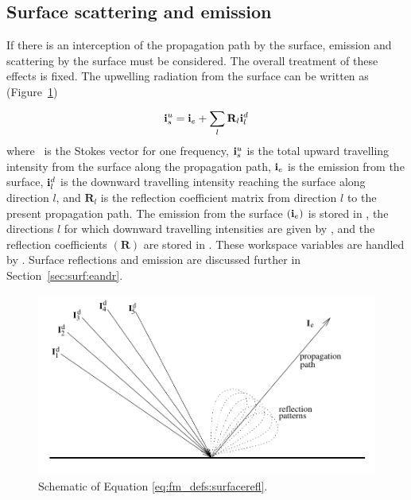 \subsection{Surface scattering and emission}
\label{sec:fm_defs:surface}

If there is an interception of the propagation path by the surface,
emission and scattering by the surface must be considered. The overall
treatment of these effects is fixed. The upwelling radiation from the surface
can be written as (Figure~\ref{fig:fm_defs:surface_refl})
\begin{equation}
  \mathbf{i}_s^u = \mathbf{i}_e + \sum_l^{} \mathbf{R}_l \mathbf{i}_l^d
  \label{eq:fm_defs:surfacerefl}
\end{equation}
where \MpiVct\ is the Stokes vector for one frequency, $\mathbf{i}_s^u$
is the total upward travelling intensity from the surface along the
propagation path, $\mathbf{i}_e$ is the emission from the surface,
$\mathbf{i}_l^d$ is the downward travelling intensity reaching the
surface along direction $l$, and $\mathbf{R}_l$ is the reflection
coefficient matrix from direction $l$ to the present propagation path.
The emission from the surface $(\mathbf{i}_e)$ is stored in
, the directions $l$ for which downward
travelling intensities are given by , and the
reflection coefficients $(\mathbf{R})$ are stored in
. These workspace variables are handled by
. Surface reflections and emission are
discussed further in Section~\ref{sec:surf:eandr}.
\begin{figure}
 \begin{center}
  \includegraphics*[width=0.95\hsize]{ground_refl}
  \caption{Schematic of Equation \ref{eq:fm_defs:surfacerefl}.}
  \label{fig:fm_defs:surface_refl}
 \end{center}
\end{figure}



